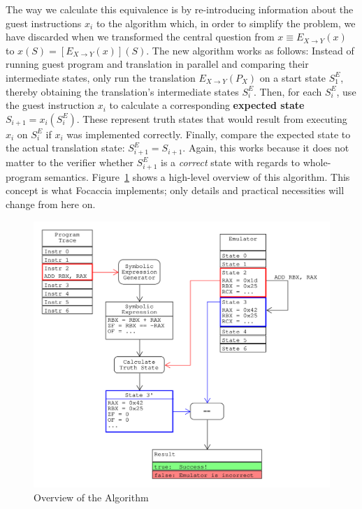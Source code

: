 The way we calculate this equivalence is by re-introducing information about the guest instructions $x_i$ to the
algorithm which, in order to simplify the problem, we have discarded when we transformed the central question from $x
\equiv E_{X \rightarrow Y}(x)$ to $x(S) = [E_{X \rightarrow Y}(x)](S)$. The new algorithm works as follows: Instead of
running guest program and translation in parallel and comparing their intermediate states, only run the translation
$E_{X \rightarrow Y}(P_X)$ on a start state $S^E_1$, thereby obtaining the translation's intermediate states $S^E_i$.
Then, for each $S^E_i$, use the guest instruction $x_i$ to calculate a corresponding \textbf{expected state} $S_{i+1} =
x_i(S^E_i)$. These represent truth states that would result from executing $x_i$ on $S^E_i$ if $x_i$ was implemented
correctly. Finally, compare the expected state to the actual translation state: $S^E_{i+1} = S_{i+1}$. Again, this works
because it does not matter to the verifier whether $S^E_{i+1}$ is a \textit{correct} state with regards to whole-program
semantics. Figure~\ref{fig:algo_overview} shows a high-level overview of this algorithm. This concept is what Focaccia
implements; only details and practical necessities will change from here on.

\begin{figure}[htpb]
    \centering
    \includegraphics[width=1.0\linewidth]{figures/algorithm_overview.png}
    \caption{Overview of the Algorithm}\label{fig:algo_overview}
\end{figure}

